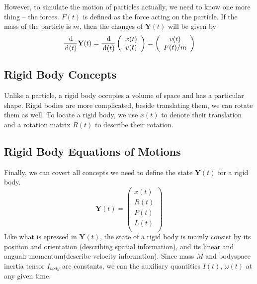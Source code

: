 However, to simulate the motion of particles actually, we need to know one more thing -- the forces. $F(t)$ is defined as the force acting on the particle. If the mass of the particle is $m$, then the changes of $\textbf{Y}(t)$ will be given by
\begin{equation}
    \frac{\,\mathrm{d}}{\,\mathrm{d}(t)}\textbf{Y}(t) = \frac{\,\mathrm{d}}{\,\mathrm{d}(t)}\left(
        \begin{array}{c}
            x(t) \\
            v(t) \\
        \end{array} \right) = \left(
        \begin{array}{c}
            v(t) \\
            F(t)/m \\
        \end{array} \right)
\end{equation}

\subsection{Rigid Body Concepts}
Unlike a particle, a rigid body occupies a volume of space and has a particular shape. Rigid bodies are more complicated, beside translating them, we can rotate them as well. To locate a rigid body, we use $x(t)$ to denote their translation and a rotation matrix $R(t)$ to describe their rotation.

\subsection{Rigid Body Equations of Motions}
Finally, we can covert all concepts we need to define the state $\textbf{Y}(t)$ for a rigid body.
\begin{equation}
    \textbf{Y}(t) = \left(
        \begin{array}{c}
            x(t) \\
            R(t) \\
            P(t) \\
            L(t) \\
        \end{array}
    \right)
\end{equation}
Like what is epressed in $\textbf{Y}(t)$, the state of a rigid body is mainly consist by its position and orientation (describing spatial information), and its linear and angualr momentum(describe velocity information). Since mass $M$ and bodyspace inertia tensor $I_{body}$ are constants, we can the auxiliary quantities $I(t)$, $\omega(t)$ at any given time.


